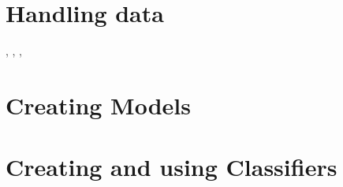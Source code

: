 \documentclass[a4paper]{report}
\begin{document}
\section{Handling data}
\Alphabet, \AlphabetContainer, \Sequence, \Sample

\section{Creating Models}


\section{Creating and using Classifiers}
\end{document}

